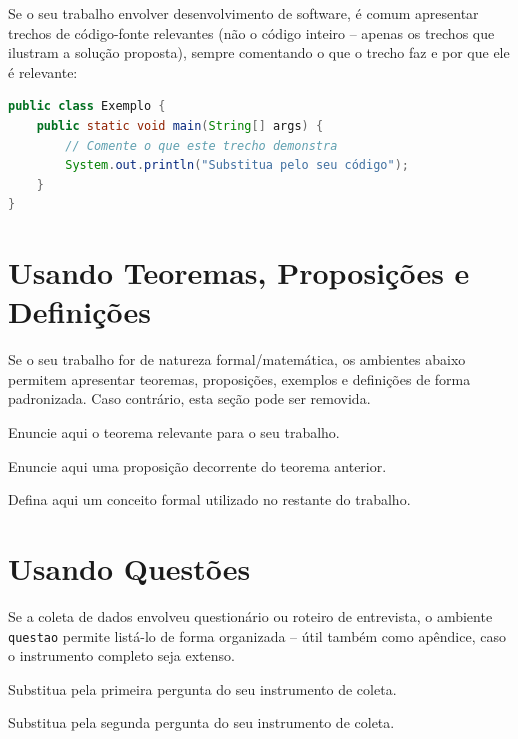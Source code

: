 Se o seu trabalho envolver desenvolvimento de software, é comum apresentar trechos de código-fonte relevantes (não o código inteiro -- apenas os trechos que ilustram a solução proposta), sempre comentando o que o trecho faz e por que ele é relevante:

\begin{lstlisting}[language=Java,caption={Substitua pela legenda do seu trecho de código}]
public class Exemplo {
	public static void main(String[] args) {
		// Comente o que este trecho demonstra
		System.out.println("Substitua pelo seu código");
	}
}
\end{lstlisting}

\section{Usando Teoremas, Proposições e Definições}

Se o seu trabalho for de natureza formal/matemática, os ambientes abaixo permitem apresentar teoremas, proposições, exemplos e definições de forma padronizada. Caso contrário, esta seção pode ser removida.

\begin{teo}
	Enuncie aqui o teorema relevante para o seu trabalho.
\end{teo}

\begin{prop}
	Enuncie aqui uma proposição decorrente do teorema anterior.
\end{prop}

\begin{xdefinicao}
	Defina aqui um conceito formal utilizado no restante do trabalho.
\end{xdefinicao}

\section{Usando Questões}

Se a coleta de dados envolveu questionário ou roteiro de entrevista, o ambiente \texttt{questao} permite listá-lo de forma organizada -- útil também como apêndice, caso o instrumento completo seja extenso.

\begin{questao}
	\item Substitua pela primeira pergunta do seu instrumento de coleta.
	\item Substitua pela segunda pergunta do seu instrumento de coleta.
\end{questao}

